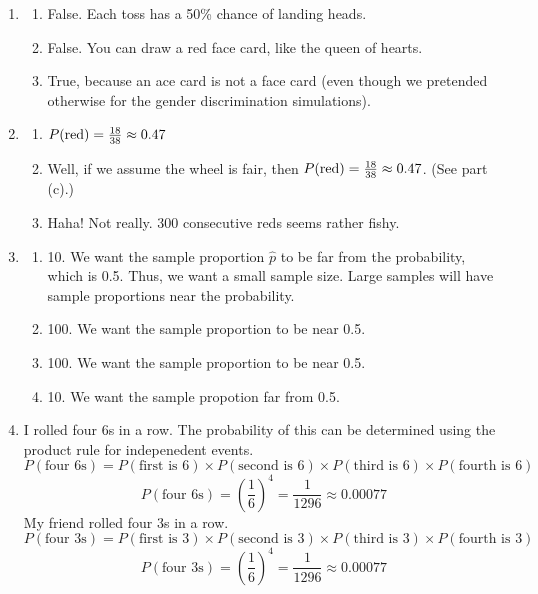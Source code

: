 \documentclass[12pt,letterpaper]{article}
\begin{document}
\begin{enumerate}
\item \begin{enumerate}
    \item False. Each toss has a 50\% chance of landing heads.
    \item False. You can draw a red face card, like the queen of hearts.
    \item True, because an ace card is not a face card (even though we pretended otherwise for the gender discrimination simulations).
\end{enumerate}

\item \begin{enumerate}
    \item $P(\rm{red}) = \frac{18}{38} \approx 0.47$
    \item Well, if we assume the wheel is fair, then $P(\rm{red}) = \frac{18}{38} \approx 0.47$. (See part (c).)
    \item Haha! Not really. 300 consecutive reds seems rather fishy. 
\end{enumerate}

\item \begin{enumerate}
    \item 10. We want the sample proportion $\hat{p}$ to be far from the probability, which is 0.5. Thus, we want a small sample size. Large samples will have sample proportions near the probability.
    \item 100. We want the sample proportion to be near 0.5.
    \item 100. We want the sample proportion to be near 0.5.
    \item 10. We want the sample propotion far from 0.5.
\end{enumerate}

\item I rolled four 6s in a row. The probability of this can be determined using the product rule for indepenedent events.
$$P(\text{four 6s}) = P(\text{first is 6}) \times P(\text{second is 6})\times P(\text{third is 6})\times P(\text{fourth is 6})$$
$$P(\text{four 6s}) = \left(\frac{1}{6}\right)^4 = \frac{1}{1296} \approx 0.00077$$
My friend rolled four 3s in a row.
$$P(\text{four 3s}) = P(\text{first is 3}) \times P(\text{second is 3})\times P(\text{third is 3})\times P(\text{fourth is 3})$$
$$P(\text{four 3s}) = \left(\frac{1}{6}\right)^4 = \frac{1}{1296} \approx 0.00077$$


\end{enumerate}
\end{document}
